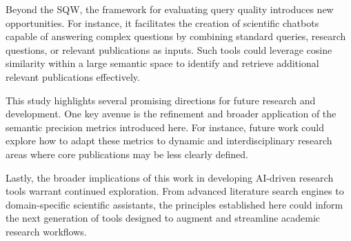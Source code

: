 Beyond the SQW, the framework for evaluating query quality introduces new opportunities. For instance, it facilitates the creation of scientific chatbots capable of answering complex questions by combining standard queries, research questions, or relevant publications as inputs. Such tools could leverage cosine similarity within a large semantic space to identify and retrieve additional relevant publications effectively.

This study highlights several promising directions for future research and development. One key avenue is the refinement and broader application of the semantic precision metrics introduced here. For instance, future work could explore how to adapt these metrics to dynamic and interdisciplinary research areas where core publications may be less clearly defined. 

Lastly, the broader implications of this work in developing AI-driven research tools warrant continued exploration. From advanced literature search engines to domain-specific scientific assistants, the principles established here could inform the next generation of tools designed to augment and streamline academic research workflows.
